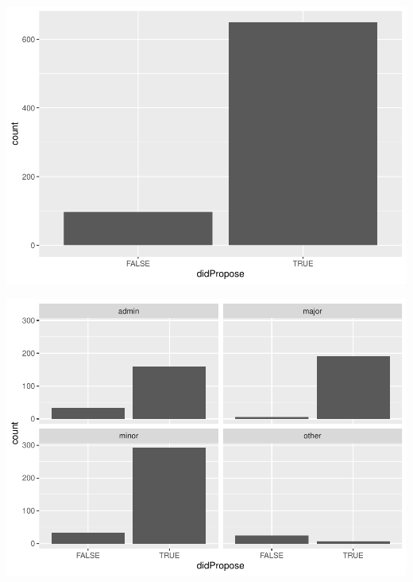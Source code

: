 \documentclass[
]{article}
\newenvironment{Shaded}{\begin{snugshade}}{\end{snugshade}}
\newcommand{\KeywordTok}[1]{\textcolor[rgb]{0.13,0.29,0.53}{\textbf{#1}}}
\newcommand{\NormalTok}[1]{#1}
\newcommand{\OperatorTok}[1]{\textcolor[rgb]{0.81,0.36,0.00}{\textbf{#1}}}
\newcommand{\StringTok}[1]{\textcolor[rgb]{0.31,0.60,0.02}{#1}}
\begin{document}
\begin{Shaded}
\end{Shaded}

\includegraphics{ProposalAnalysis_files/figure-latex/unnamed-chunk-9-5.pdf}

\begin{Shaded}
\end{Shaded}

\includegraphics{ProposalAnalysis_files/figure-latex/unnamed-chunk-9-6.pdf}
\end{document}
